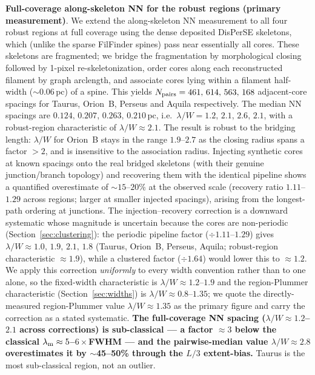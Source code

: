 \documentclass[usenatbib,twoside,twocolumn]{mnras}
\begin{document}
\textbf{Full-coverage along-skeleton NN for the robust regions (primary measurement)}. We extend the along-skeleton NN measurement to all four robust regions at full coverage using the dense deposited DisPerSE skeletons, which (unlike the sparse FilFinder spines) pass near essentially all cores. These skeletons are fragmented; we bridge the fragmentation by morphological closing followed by 1-pixel re-skeletonization, order cores along each reconstructed filament by graph arclength, and associate cores lying within a filament half-width ($\sim$0.06\,pc) of a spine. This yields $N_{\rm pairs} = 461,\,614,\,563,\,168$ adjacent-core spacings for Taurus, Orion~B, Perseus and Aquila respectively. The median NN spacings are $0.124,\,0.207,\,0.263,\,0.210$\,pc, i.e.\ $\lambda/W = 1.2,\,2.1,\,2.6,\,2.1$, with a robust-region characteristic of $\lambda/W \approx 2.1$. The result is robust to the bridging length: $\lambda/W$ for Orion~B stays in the range $1.9$--$2.7$ as the closing radius spans a factor $>2$, and is insensitive to the association radius. Injecting synthetic cores at known spacings onto the real bridged skeletons (with their genuine junction/branch topology) and recovering them with the identical pipeline shows a quantified overestimate of $\sim$$15$--$20$\% at the observed scale (recovery ratio $1.11$--$1.29$ across regions; larger at smaller injected spacings), arising from the longest-path ordering at junctions. The injection--recovery correction is a downward systematic whose magnitude is uncertain because the cores are non-periodic (Section~\ref{sec:clustering}): the periodic pipeline factor ($\div1.11$--$1.29$) gives $\lambda/W\approx1.0,\,1.9,\,2.1,\,1.8$ (Taurus, Orion~B, Perseus, Aquila; robust-region characteristic $\approx1.9$), while a clustered factor ($\div1.64$) would lower this to $\approx1.2$. We apply this correction \emph{uniformly} to every width convention rather than to one alone, so the fixed-width characteristic is $\lambda/W\approx1.2$--$1.9$ and the region-Plummer characteristic (Section~\ref{sec:widths}) is $\lambda/W\approx0.8$--$1.35$; we quote the directly-measured region-Plummer value $\lambda/W\approx1.35$ as the primary figure and carry the correction as a stated systematic. \textbf{The full-coverage NN spacing ($\lambda/W\approx1.2$--$2.1$ across corrections) is sub-classical --- a factor $\approx3$ below the classical $\lambda_{\rm m}\approx5$--$6\times$FWHM --- and the pairwise-median value $\lambda/W\approx2.8$ overestimates it by $\sim$45--50\% through the $L/3$ extent-bias.} Taurus is the most sub-classical region, not an outlier.
\end{document}
